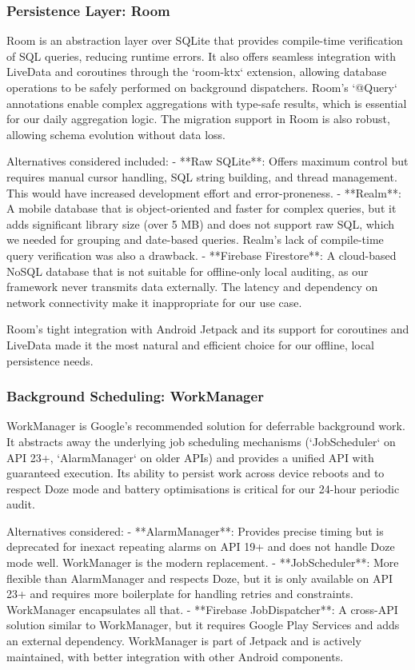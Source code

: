 \subsubsection{Persistence Layer: Room}

Room is an abstraction layer over SQLite that provides compile-time verification of SQL queries, reducing runtime errors. It also offers seamless integration with LiveData and coroutines through the `room-ktx` extension, allowing database operations to be safely performed on background dispatchers. Room's `@Query` annotations enable complex aggregations with type-safe results, which is essential for our daily aggregation logic. The migration support in Room is also robust, allowing schema evolution without data loss.

Alternatives considered included:
- **Raw SQLite**: Offers maximum control but requires manual cursor handling, SQL string building, and thread management. This would have increased development effort and error-proneness.
- **Realm**: A mobile database that is object-oriented and faster for complex queries, but it adds significant library size (over 5 MB) and does not support raw SQL, which we needed for grouping and date-based queries. Realm's lack of compile-time query verification was also a drawback.
- **Firebase Firestore**: A cloud-based NoSQL database that is not suitable for offline-only local auditing, as our framework never transmits data externally. The latency and dependency on network connectivity make it inappropriate for our use case.

Room's tight integration with Android Jetpack and its support for coroutines and LiveData made it the most natural and efficient choice for our offline, local persistence needs.

\subsubsection{Background Scheduling: WorkManager}

WorkManager is Google's recommended solution for deferrable background work. It abstracts away the underlying job scheduling mechanisms (`JobScheduler` on API 23+, `AlarmManager` on older APIs) and provides a unified API with guaranteed execution. Its ability to persist work across device reboots and to respect Doze mode and battery optimisations is critical for our 24-hour periodic audit.

Alternatives considered:
- **AlarmManager**: Provides precise timing but is deprecated for inexact repeating alarms on API 19+ and does not handle Doze mode well. WorkManager is the modern replacement.
- **JobScheduler**: More flexible than AlarmManager and respects Doze, but it is only available on API 23+ and requires more boilerplate for handling retries and constraints. WorkManager encapsulates all that.
- **Firebase JobDispatcher**: A cross-API solution similar to WorkManager, but it requires Google Play Services and adds an external dependency. WorkManager is part of Jetpack and is actively maintained, with better integration with other Android components.

